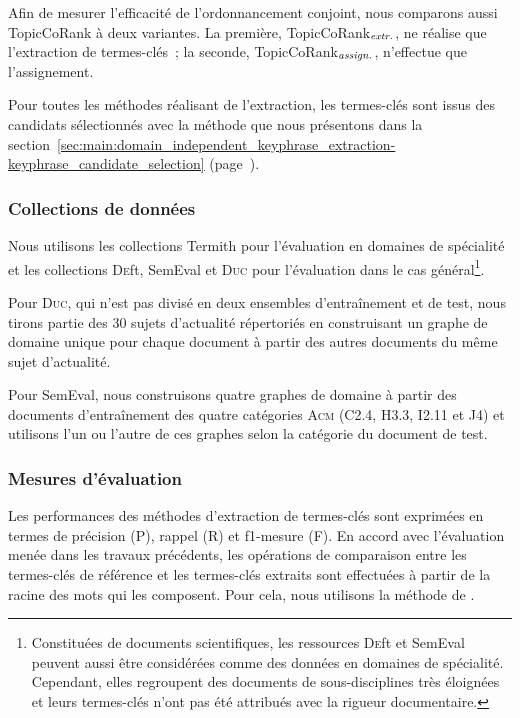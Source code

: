         Afin de mesurer l'efficacité de l'ordonnancement conjoint, nous
        comparons aussi TopicCoRank à deux variantes. La première,
        TopicCoRank$_\textnormal{\textit{extr.}}$, ne réalise que l'extraction
        de termes-clés~; la seconde,
        TopicCoRank$_\textnormal{\textit{assign.}}$, n'effectue que
        l'assignement.

        Pour toutes les méthodes réalisant de l'extraction, les termes-clés sont
        issus des candidats sélectionnés avec la méthode que nous présentons
        dans la
        section~\ref{sec:main:domain_independent_keyphrase_extraction-keyphrase_candidate_selection}
        (page~\pageref{sec:main:domain_independent_keyphrase_extraction-keyphrase_candidate_selection}).

      \subsubsection{Collections de données}
      \label{subsubsec:main-domain_specific_keyphrase_annotation-supervised_automatic_keyphrase_annotation-evaluation-evaluation_data}
        Nous utilisons les collections Termith pour l'évaluation en domaines de
        spécialité et les collections \textsc{De}ft, SemEval et \textsc{Duc}
        pour l'évaluation dans le cas général\footnote{Constituées de documents
        scientifiques, les ressources \textsc{De}ft et SemEval peuvent aussi
        être considérées comme des données en domaines de spécialité.
        Cependant, elles regroupent des documents de sous-disciplines très
        éloignées et leurs termes-clés n'ont pas été attribués avec la rigueur
        documentaire.}.
        
        Pour \textsc{Duc}, qui n'est pas divisé en deux ensembles d'entraînement
        et de test, nous tirons partie des 30 sujets d'actualité répertoriés en
        construisant un graphe \og{}de domaine\fg{} unique pour chaque document
        à partir des autres documents du même sujet d'actualité.
        
        Pour SemEval, nous construisons quatre graphes de domaine à partir des
        documents d'entraînement des quatre catégories \textsc{Acm} (C2.4, H3.3,
        I2.11 et J4) et utilisons l'un ou l'autre de ces graphes selon la
        catégorie du document de test. 
      
      \subsubsection{Mesures d'évaluation}
      \label{subsubsec:main-domain_specific_keyphrase_annotation-supervised_automatic_keyphrase_annotation-evaluation-evaluation_measures}
        Les performances des méthodes d'extraction de termes-clés sont exprimées
        en termes de précision (P), rappel (R) et f1-mesure (F). En
        accord avec l'évaluation menée dans les travaux précédents, les
        opérations de comparaison entre les termes-clés de référence et les
        termes-clés extraits sont effectuées à partir de la racine des mots qui
        les composent. Pour cela, nous utilisons la méthode de
        .


